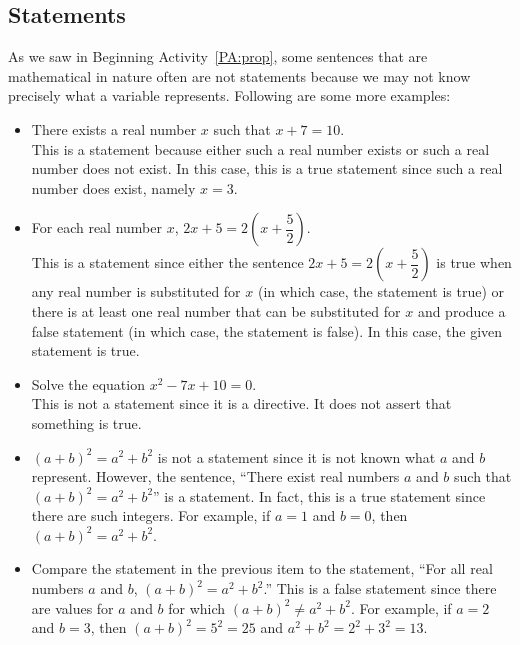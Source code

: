 \subsection*{Statements}
As we saw in Beginning Activity~\ref{PA:prop}, some sentences that are mathematical in nature often are not statements because we may not know precisely what a variable represents.  Following are some more examples:
\begin{itemize}
  \item There exists a real number $x$ such that $x+7 = 10$. \\
This is a statement because either such a real number exists or such a real number does not exist.  In this case, this is a true statement since such a real number does exist, namely $x = 3$.
  \item For each real number $x$, $2x + 5 = 2\left(x + \dfrac{5}{2} \right)$.\\
This is a statement since either the sentence $2x + 5 = 2\left(x + \dfrac{5}{2} \right)$ is true when any real number is substituted for $x$ (in which case, the statement is true) or there is at least one real number that can be substituted for $x$ and produce a false statement (in which case, the statement is false).  In this case, the given statement is true.
  \item Solve the equation $x^2 - 7x + 10 = 0$. \\
This is not a statement since it is a directive.  It does not assert that something is true.
  \item $(a + b)^2 = a^2 + b^2$ is not a statement since it is not known what $a$ and $b$ represent.  However, the sentence, ``There exist real numbers $a$ and $b$ such that $(a + b)^2 = a^2 + b^2$'' is a statement.  In fact, this is a true statement since there are such integers.  For example, if $a = 1$ and $b = 0$, then 
$(a + b)^2 = a^2 + b^2$.
  \item Compare the statement in the previous item to the statement, ``For all real numbers $a$ and $b$, 
$(a + b)^2 = a^2 + b^2$.''  This is a false statement since there are values for $a$ and $b$ for which 
$(a + b)^2 \ne a^2 + b^2$.  For example, if $a = 2$ and $b = 3$, then $(a + b)^2 = 5^2 = 25$ and 
$a^2 + b^2 = 2^2 + 3^2 = 13$.
\end{itemize}


